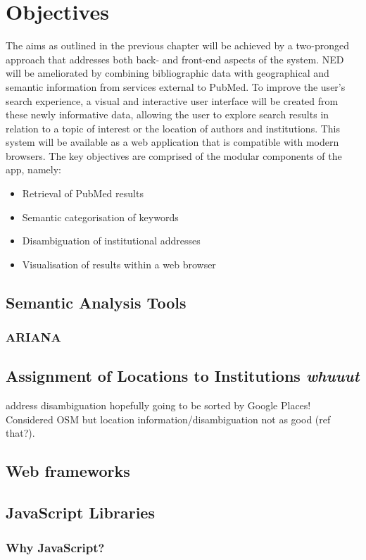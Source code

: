 \documentclass[PROP_AGutteridge_CS.tex]{subfiles}
\begin{document}
\chapter{Objectives}
The aims as outlined in the previous chapter will be achieved by a two-pronged approach that addresses both back- and front-end aspects of the system. NED will be ameliorated by combining bibliographic data with geographical and semantic information from services external to PubMed. To improve the user's search experience, a visual and interactive user interface will be created from these newly informative data, allowing the user to explore search results in relation to a topic of interest or the location of authors and institutions. This system will be available as a web application that is compatible with modern browsers. The key objectives are comprised of the modular components of the app, namely:
\begin{itemize}
\item{Retrieval of PubMed results}
\item{Semantic categorisation of keywords}
\item{Disambiguation of institutional addresses}
\item{Visualisation of results within a web browser}
\end{itemize}

\section{Semantic Analysis Tools} 
\subsection{ARIANA}

\section{Assignment of Locations to Institutions \emph{whuuut}}
address disambiguation hopefully going to be sorted by Google Places! Considered OSM but location information/disambiguation not as good (ref that?). 

\section{Web frameworks}

\section{JavaScript Libraries}
\subsection{Why JavaScript?} 
   
 
\end{document}
